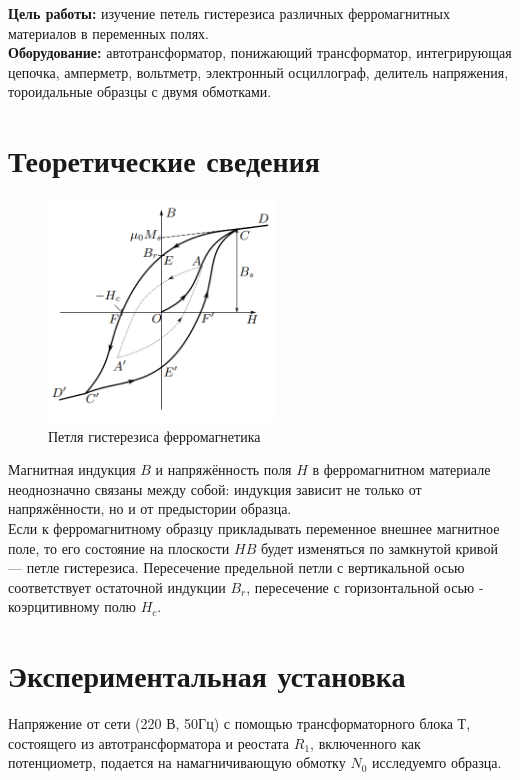 \textbf{Цель работы:} изучение петель гистерезиса различных ферромагнитных
материалов в переменных полях.\\\indent
\textbf{Оборудование:} автотрансформатор, понижающий трансформатор, интегрирующая цепочка, амперметр, вольтметр, электронный
осциллограф, делитель напряжения, тороидальные образцы с двумя обмотками.

\section*{Теоретические сведения}

\begin{figure}
    \centering
    \includegraphics[width=6cm]{images/gisterezis.png}
    \caption{Петля гистерезиса ферромагнетика}
\end{figure}

\indent Магнитная индукция $B$ и напряжённость поля $H$ в ферромагнитном материале неоднозначно связаны между собой: индукция зависит
не только от напряжённости, но и от предыстории образца.\\
\indent Если к ферромагнитному образцу прикладывать переменное внешнее
магнитное поле, то его состояние на плоскости $HB$ будет изменяться
по замкнутой кривой — петле гистерезиса. Пересечение предельной петли с вертикальной осью соответствует остаточной индукции $B_r$, пересечение с горизонтальной осью - коэрцитивному полю $H_c$.
\\
\section*{Экспериментальная установка}
\indent Напряжение от сети (220 В, 50Гц) с помощью трансформаторного блока Т, состоящего из автотрансформатора и реостата $R_1$, включенного как потенциометр, подается на намагничивающую обмотку $N_0$ исследуемго образца.

